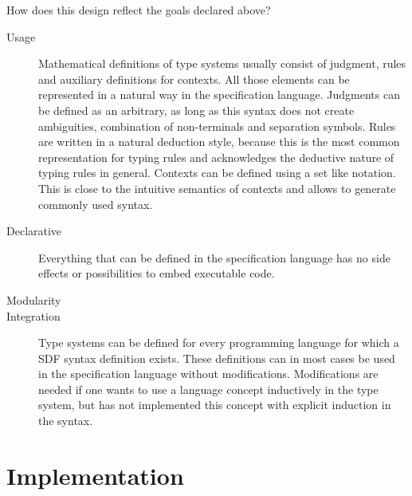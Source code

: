 How does this design reflect the goals declared above?

\begin{description}
\item[Usage] Mathematical definitions of type systems usually consist
  of judgment, rules and auxiliary definitions for contexts. All
  those elements can be represented in a natural way in the
  specification language. Judgments can be defined as an arbitrary, as long
  as this syntax does not create ambiguities, combination of
  non-terminals and separation symbols. Rules are written in a natural
  deduction style, because this is the most common representation for
  typing rules and acknowledges the deductive nature of typing rules
  in general. Contexts can be defined using a set like
  notation. This is close to the intuitive semantics of contexts
  and allows to generate commonly used syntax.
\item[Declarative] Everything that can be defined in the specification
  language has no side effects or possibilities to embed executable
  code.
\item[Modularity] 
\item[Integration] Type systems can be defined for every programming
  language for which a SDF syntax definition exists. These definitions
  can in most cases be used in the specification language without
  modifications. Modifications are needed if one wants to use a
  language concept inductively in the type system, but has not
  implemented this concept with explicit induction in the
  syntax.
\end{description}
\section{Implementation}
\label{sec:generate-sdf}


